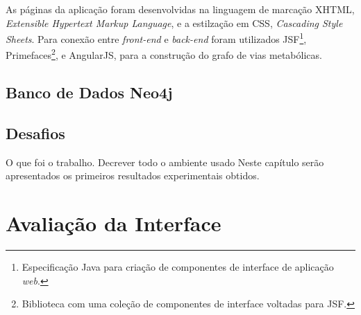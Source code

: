 \indent As páginas da aplicação foram desenvolvidas na linguagem de marcação XHTML, \textit{Extensible Hypertext Markup Language}, e a estilzação em CSS, \textit{Cascading Style Sheets}. Para conexão entre \textit{front-end} e \textit{back-end} foram utilizados JSF\footnote{Especificação Java para criação de componentes de interface de aplicação \textit{web}.}, Primefaces\footnote{Biblioteca com uma coleção de componentes de interface voltadas para JSF.}, e AngularJS, para a construção do grafo de vias metabólicas.




\subsection{Banco de Dados Neo4j}


\subsection{Desafios}
 
O que foi o trabalho. 
Decrever todo o ambiente usado
Neste capítulo serão apresentados os primeiros resultados experimentais obtidos.

\section{Avaliação da Interface}

